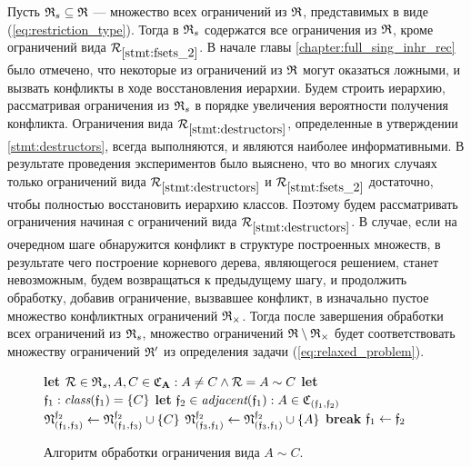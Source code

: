 Пусть $\mathfrak{R}_s \subseteq \mathfrak{R}$ --- множество всех ограничений из $\mathfrak{R}$, представимых в виде (\ref{eq:restriction_type}). Тогда в $\mathfrak{R}_s$ содержатся все ограничения из $\mathfrak{R}$, кроме ограничений вида $\mathcal{R}_{\ref{stmt:fsets_2}}$. В начале главы \ref{chapter:full_sing_inhr_rec} было отмечено, что некоторые из ограничений из $\mathfrak{R}$ могут оказаться ложными, и вызвать конфликты в ходе восстановления иерархии. Будем строить иерархию, рассматривая ограничения из $\mathfrak{R}_s$ в порядке увеличения вероятности получения конфликта. Ограничения вида $\mathcal{R}_{\ref{stmt:destructors}}$, определенные в утверждении \ref{stmt:destructors}, всегда выполняются, и являются наиболее информативными. В результате проведения экспериментов было выяснено, что во многих случаях только ограничений вида $\mathcal{R}_{\ref{stmt:destructors}}$ и $\mathcal{R}_{\ref{stmt:fsets_2}}$ достаточно, чтобы полностью восстановить иерархию классов. Поэтому будем рассматривать ограничения начиная с ограничений вида $\mathcal{R}_{\ref{stmt:destructors}}$. В случае, если на очередном шаге обнаружится конфликт в структуре построенных множеств, в результате чего построение корневого дерева, являющегося решением, станет невозможным, будем возвращаться к предыдущему шагу, и продолжить обработку, добавив ограничение, вызвавшее конфликт, в изначально пустое множество конфликтных ограничений $\mathfrak{R}_{\times}$. Тогда после завершения обработки всех ограничений из $\mathfrak{R}_s$, множество ограничений $\mathfrak{R} \setminus \mathfrak{R}_{\times}$ будет соответствовать множеству ограничений $\mathfrak{R}'$ из определения задачи (\ref{eq:relaxed_problem}).


\begin{figure}[htb!]
\begin{algorithmic}[1]
\STATE \textbf{let} $\mathcal{R} \in \mathfrak{R}_s, A, C \in \mathfrak{C}_{\mathbf{A}}: A \ne C \wedge \mathcal{R} = A \sim C$
\STATE \textbf{let} $\mathfrak{f}_1: \textit{class}(\mathfrak{f}_1) = \{C\}$
    \STATE {}
    \STATE \textbf{let} $\mathfrak{f}_2 \in \textit{adjacent}(\mathfrak{f}_1): A \in \mathfrak{C}_{(\mathfrak{f}_1, \mathfrak{f}_2)}$
        \STATE $\mathfrak{N}^{\mathfrak{f}_2}_{(\mathfrak{f}_1, \mathfrak{f}_3)} \gets \mathfrak{N}^{\mathfrak{f}_2}_{(\mathfrak{f}_1, \mathfrak{f}_3)} \cup \{C\}$
        \STATE $\mathfrak{N}^{\mathfrak{f}_2}_{(\mathfrak{f}_3, \mathfrak{f}_1)} \gets \mathfrak{N}^{\mathfrak{f}_2}_{(\mathfrak{f}_3, \mathfrak{f}_1)} \cup \{A\}$
        \STATE \textbf{break}
    \ENDIF
    \STATE $\mathfrak{f}_1 \gets \mathfrak{f}_2$
\ENDWHILE
\end{algorithmic}
\caption{Алгоритм обработки ограничения вида  $A \sim C$.}
\label{alg:process_sim}
\end{figure}


